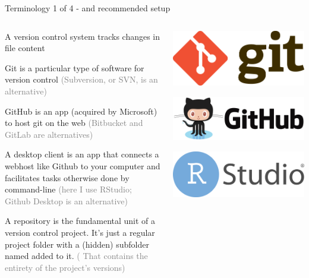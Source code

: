 \documentclass[ignorenonframetext, 10pt, aspectratio=169]{beamer}
\begin{document}
\begin{frame}{Terminology 1 of 4  - and recommended setup}
\begin{columns}[T]
\begin{column}{0.65\textwidth}
\begin{wideitemize}
\item<1-> A version control system \alert{tracks} changes in file content
\item<2-> \alert{Git} is a particular type of software for version control \textcolor{gray}{(Subversion, or SVN, is an alternative)}
\item<3-> \alert{GitHub} is an app (acquired by Microsoft) to host git on the web \textcolor{gray}{(Bitbucket and GitLab are alternatives)}
\item<4-> A \alert{desktop client} is an app that connects a webhost like Github to your computer and facilitates tasks otherwise done by \alert{command-line} \textcolor{gray}{(here I use \alert{RStudio}; Github Desktop is an alternative)}
\item<5-> A \alert{repository} is the fundamental unit of a version control project. It's just a regular project folder with a (hidden) subfolder named  added to it. \textcolor{gray}{( That  contains the entirety of the project's versions)}
\end{wideitemize}
\end{column}
\begin{column}{0.35\textwidth}
\centering
{}\includegraphics[width = 0.6\linewidth]{Git-Logo-2Color.png}

\bigskip
{}\includegraphics[width = 0.6\linewidth]{github-logo-1.png}

\bigskip
{}\includegraphics[width = 0.6\linewidth]{RStudio-Logo-Flat.png}


\end{column}
\end{columns}
\end{frame}
\end{document}
